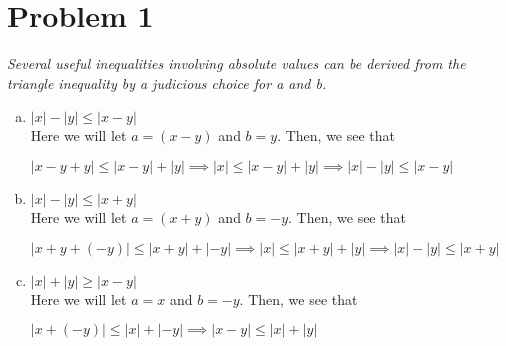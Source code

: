 \documentclass{article}
\newcommand\abs[1]{\left|#1\right|}
\begin{document}

\section*{Problem 1}
\begin{flushleft}
\textit{Several useful inequalities involving absolute values can be derived from the triangle inequality by a judicious choice for a and b.}
\begin{enumerate}[(a)]
For any of these examples, we can redefine $x$ and $y$ to be $a$ and $b$, which will help us reduce to the following variants of the triangle inequalities. For each of the following inequalities, I use the following format $\abs{a} + \abs{b} \leq \abs{a+b}$.

\item $\abs{x} - \abs{y} \leq \abs{x-y}$ \\
\vspace{.3cm}
Here we will let $a=(x-y)$ and $b=y$. Then, we see that \\
\begin{center}
$\abs{x-y+y} \leq \abs{x-y} + \abs{y} \implies \abs{x} \leq \abs{x-y} + \abs{y} \implies \abs{x} - \abs{y} \leq \abs{x-y}$
\end{center}

\item $\abs{x} - \abs{y} \leq \abs{x+y}$ \\
\vspace{.3cm}
Here we will let $a=(x+y)$ and $b=-y$. Then, we see that \\
\begin{center}
$\abs{x+y+(-y)} \leq \abs{x+y} + \abs{-y} \implies \abs{x} \leq \abs{x+y} + \abs{y} \implies \abs{x} - \abs{y} \leq \abs{x+y}$ 
\end{center}

\item $\abs{x} + \abs{y} \geq \abs{x-y}$ \\
\vspace{.3cm}
Here we will let $a=x$ and $b=-y$. Then, we see that \\
\begin{center}
$\abs{x+(-y)} \leq \abs{x} + \abs{-y} \implies \abs{x-y} \leq \abs{x} + \abs{y}$ 
\end{center}


\end{enumerate}
\end{flushleft}
\end{document}
